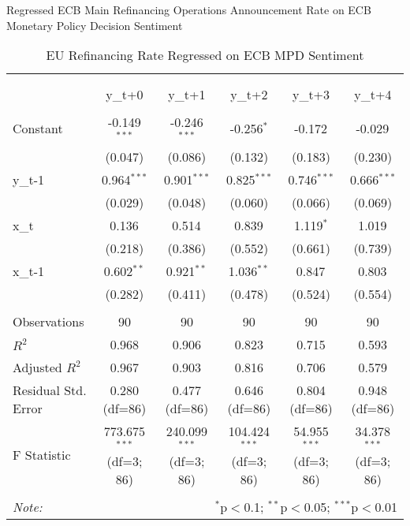 \documentclass[12pt, letterpaper]{article}
\begin{document}
 Regressed ECB Main Refinancing Operations Announcement Rate on ECB Monetary Policy Decision Sentiment

\begin{table}[H] \centering
  \caption{EU Refinancing Rate Regressed on ECB MPD Sentiment}
\begin{tabular}{@{\extracolsep{5pt}}lccccc}
\\[-1.8ex]\hline
\hline \\[-1.8ex]
\\[-1.8ex] & \multicolumn{1}{c}{y_{t+0}} & \multicolumn{1}{c}{y_{t+1}} & \multicolumn{1}{c}{y_{t+2}} & \multicolumn{1}{c}{y_{t+3}} & \multicolumn{1}{c}{y_{t+4}}  \\
\hline \\[-1.8ex]
 Constant & -0.149$^{***}$ & -0.246$^{***}$ & -0.256$^{*}$ & -0.172$^{}$ & -0.029$^{}$ \\
& (0.047) & (0.086) & (0.132) & (0.183) & (0.230) \\
 y_{t-1} & 0.964$^{***}$ & 0.901$^{***}$ & 0.825$^{***}$ & 0.746$^{***}$ & 0.666$^{***}$ \\
& (0.029) & (0.048) & (0.060) & (0.066) & (0.069) \\
 x_{t} & 0.136$^{}$ & 0.514$^{}$ & 0.839$^{}$ & 1.119$^{*}$ & 1.019$^{}$ \\
& (0.218) & (0.386) & (0.552) & (0.661) & (0.739) \\
 x_{t-1} & 0.602$^{**}$ & 0.921$^{**}$ & 1.036$^{**}$ & 0.847$^{}$ & 0.803$^{}$ \\
& (0.282) & (0.411) & (0.478) & (0.524) & (0.554) \\
\hline \\[-1.8ex]
 Observations & 90 & 90 & 90 & 90 & 90 \\
 $R^2$ & 0.968 & 0.906 & 0.823 & 0.715 & 0.593 \\
 Adjusted $R^2$ & 0.967 & 0.903 & 0.816 & 0.706 & 0.579 \\
 Residual Std. Error & 0.280 (df=86) & 0.477 (df=86) & 0.646 (df=86) & 0.804 (df=86) & 0.948 (df=86) \\
 F Statistic & 773.675$^{***}$ (df=3; 86) & 240.099$^{***}$ (df=3; 86) & 104.424$^{***}$ (df=3; 86) & 54.955$^{***}$ (df=3; 86) & 34.378$^{***}$ (df=3; 86) \\
\hline
\hline \\[-1.8ex]
\textit{Note:} & \multicolumn{5}{r}{$^{*}$p$<$0.1; $^{**}$p$<$0.05; $^{***}$p$<$0.01} \\
\end{tabular}
\end{table}
\end{document}
